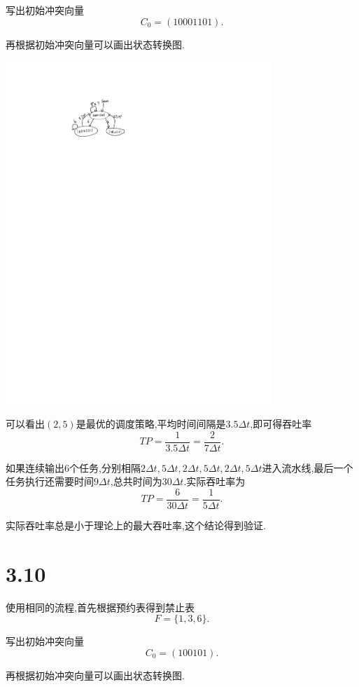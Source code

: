 \documentclass[adobefonts, nocap]{ctexart}
\begin{document}
    写出初始冲突向量
    \[
      C_{0}=(10001101).
    \]

    再根据初始冲突向量可以画出状态转换图.

    \begin{center}
      \includegraphics[width=10cm]{2-crop.pdf}
    \end{center}

    可以看出$(2,5)$是最优的调度策略,平均时间间隔是$3.5\Delta t$,即可得吞吐率
    \[
      TP=\frac{1}{3.5\Delta t}=\frac{2}{7\Delta t}.
    \]

    如果连续输出$6$个任务,分别相隔$2\Delta t, 5\Delta t, 2\Delta t, 5\Delta t, 2\Delta t, 5\Delta t$进入流水线,最后一个任务执行还需要时间$9\Delta t$,总共时间为$30\Delta t$.实际吞吐率为
    \[
      TP=\frac{6}{30\Delta t}=\frac{1}{5\Delta t}.
    \]
    
    实际吞吐率总是小于理论上的最大吞吐率,这个结论得到验证.
  \section*{3.10}
    使用相同的流程,首先根据预约表得到禁止表
    \[
      F=\{1,3,6\}.
    \]

    写出初始冲突向量
    \[
      C_{0}=(100101).
    \]

    再根据初始冲突向量可以画出状态转换图.
\end{document}
